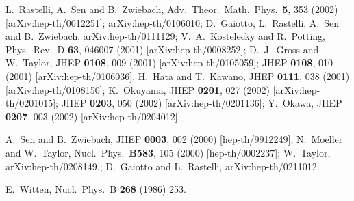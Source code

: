 \documentclass[a4paper,11pt]{article}
\begin{document}
\begin{thebibliography}{99}
 {\small %
}

{\small %
L.~Rastelli, A.~Sen and B.~Zwiebach,
Adv.\ Theor.\ Math.\ Phys.\ \textbf{5}, 353 (2002) [arXiv:hep-th/0012251];
arXiv:hep-th/0106010; \newline
%
%
D.~Gaiotto, L.~Rastelli, A.~Sen and B.~Zwiebach,
arXiv:hep-th/0111129;\newline
%
V.~A.~Kostelecky and R.~Potting,
Phys.\ Rev.\ D \textbf{63}, 046007 (2001) [arXiv:hep-th/0008252];\newline
%
D.~J.~Gross and W.~Taylor, %
JHEP \textbf{0108}, 009 (2001) [arXiv:hep-th/0105059];
%
%
JHEP \textbf{0108}, 010 (2001) [arXiv:hep-th/0106036].\newline
%
%
H.~Hata and T.~Kawano,
JHEP \textbf{0111}, 038 (2001) [arXiv:hep-th/0108150];\newline
K.~Okuyama, %
JHEP \textbf{0201}, 027 (2002) [arXiv:hep-th/0201015]; %
JHEP \textbf{0203}, 050 (2002) [arXiv:hep-th/0201136];\newline
%
Y.~Okawa,
JHEP \textbf{0207}, 003 (2002) [arXiv:hep-th/0204012].
}

 {\small %
A.\ Sen and B.\ Zwiebach, %
JHEP \textbf{0003}, 002 (2000) [hep-th/9912249];\newline
%
N.\ Moeller and W.\ Taylor,
Nucl.\ Phys.\ \textbf{B583}, 105 (2000) [hep-th/0002237];\newline
W.~Taylor, %
arXiv:hep-th/0208149.;\newline
%
%
D.~Gaiotto and L.~Rastelli, %
arXiv:hep-th/0211012. %
}

{\small %
}

 {\small E.~Witten,
Nucl.\ Phys.\ B \textbf{268} (1986) 253. %
}


\end{thebibliography}
\end{document}
